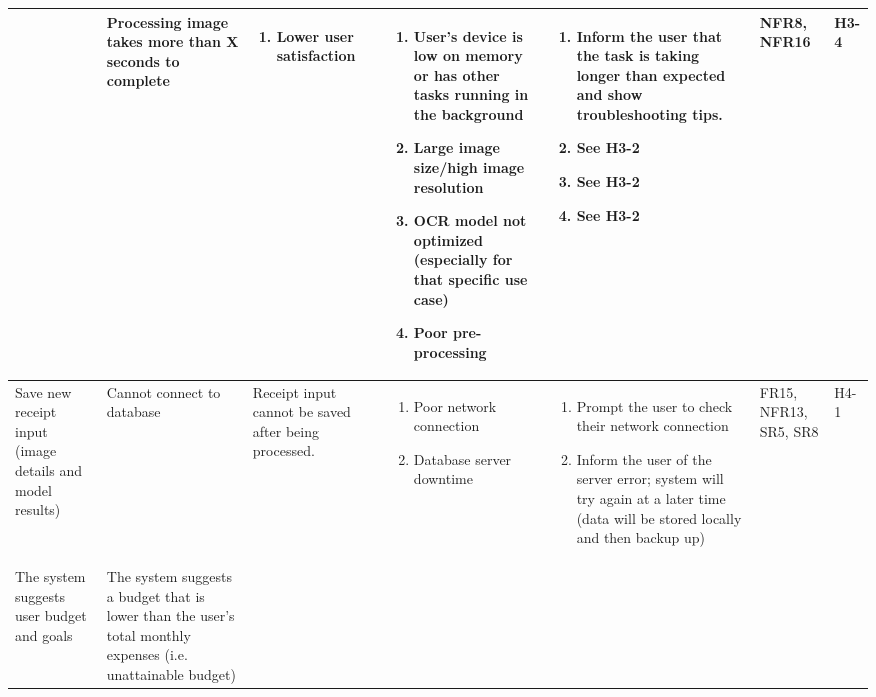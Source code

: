\documentclass{article}
\begin{document}
\begin{landscape}
\begin{longtable}{|p{3cm}|p{4cm}|p{5cm}|p{5cm}|p{5cm}|p{1cm}|p{0.75cm}|}
    & 
    Processing image takes more than X seconds to complete &
    \begin{enumerate}[label=(\alph*), leftmargin=0.5cm]
        \item Lower user satisfaction
    \end{enumerate} &
    \begin{enumerate}[label=(\alph*), leftmargin=0.5cm]
        \item User’s device is low on memory or has other tasks running in the background
        \item Large image size/high image resolution
        \item OCR model not optimized (especially for that specific use case)
        \item Poor pre-processing  
    \end{enumerate} &
    \begin{enumerate}[label=(\alph*), leftmargin=0.5cm]
        \item Inform the user that the task is taking longer than expected and show troubleshooting tips.
        \item See H3-2
        \item See H3-2
        \item See H3-2
    \end{enumerate} &
    NFR8, NFR16 &
    H3-4\\
    \hline
    Save new receipt input (image details and model results) &
    Cannot connect to database &
    Receipt input cannot be saved after being processed. &
    \begin{enumerate}[label=(\alph*), leftmargin=0.5cm]
        \item Poor network connection
        \item Database server downtime
    \end{enumerate} &
    \begin{enumerate}[label=(\alph*), leftmargin=0.5cm]
        \item Prompt the user to check their network connection
        \item Inform the user of the server error; system will try again at a later time (data will be stored locally and then backup up)
    \end{enumerate} &
    FR15, NFR13, SR5, SR8 &
    H4-1 \\
    \hline
    The system suggests user budget and goals &
    The system suggests a budget that is lower than the user's total monthly expenses (i.e. unattainable budget) &

\end{longtable}
\end{landscape}
\end{document}

